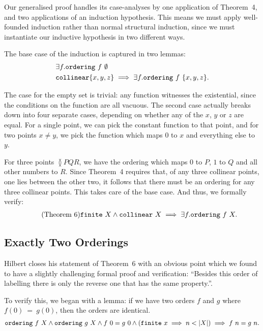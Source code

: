 Our generalised proof handles its case-analyses by one application of Theorem~4, and two applications of an induction hypothesis. This means we must apply well-founded induction rather than normal structural induction, since we must instantiate our inductive hypothesis in two different ways. 

The base case of the induction is captured in two lemmas:
\begin{displaymath}
  \begin{aligned}
    &\exists f. \code{ordering}\ f\ \emptyset\\
    &\code{collinear} \{x,y,z\} \implies \exists f. \code{ordering}\ f\ \{x,y,z\}.
  \end{aligned}
\end{displaymath}

The case for the empty set is trivial: any function witnesses the existential, since the conditions on the function are all vacuous. The second case actually breaks down into four separate cases, depending on whether any of the $x$, $y$ or $z$ are equal. For a single point, we can pick the constant function to that point, and for two points $x \neq y$, we pick the function which maps $0$ to $x$ and everything else to $y$.

For three points $\between{P}{Q}{R}$, we have the ordering which maps $0$ to $P$, $1$ to $Q$ and all other numbers to $R$. Since Theorem~4 requires that, of any three collinear points, one lies between the other two, it follows that there must be an ordering for any three collinear points. This takes care of the base case. And thus, we formally verify:
\begin{equation}
  \label{eq:six}
  \tag{Theorem~6}
  \begin{split}
    \texttt{finite}\ X \wedge \texttt{collinear}\ X \implies \exists f. \texttt{ordering}\ f\ X.
  \end{split}
\end{equation}

\subsection{Exactly Two Orderings}
Hilbert closes his statement of Theorem~6 with an obvious point which we found to have a slightly challenging formal proof and verification: ``Besides this order of labelling there is only the reverse one that has the same property.''.

To verify this, we began with a lemma: if we have two orders $f$ and $g$ where\linebreak $f(0)~=~g(0)$, then the orders are identical. 
\begin{multline}
  \texttt{ordering}\ f\ X \wedge \texttt{ordering}\ g\ X \wedge f\ 0 = g\ 0
  \wedge (\texttt{finite}\ x \implies n < |X|) \implies f\ n = g\ n.
\end{multline}

